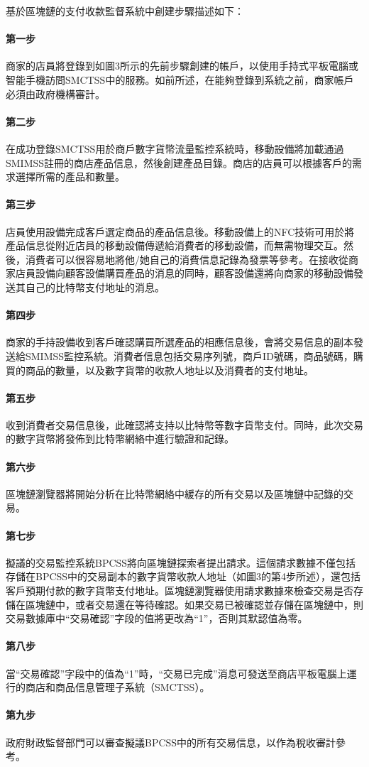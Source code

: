 	基於區塊鏈的支付收款監督系統中創建步驟描述如下：
		\paragraph{第一步}商家的店員將登錄到如圖3所示的先前步驟創建的帳戶，以使用手持式平板電腦或智能手機訪問SMCTSS中的服務。如前所述，在能夠登錄到系統之前，商家帳戶必須由政府機構審計。
		\paragraph{第二步}在成功登錄SMCTSS用於商戶數字貨幣流量監控系統時，移動設備將加載通過SMIMSS註冊的商店產品信息，然後創建產品目錄。商店的店員可以根據客戶的需求選擇所需的產品和數量。
		\paragraph{第三步}店員使用設備完成客戶選定商品的產品信息後。移動設備上的NFC技術可用於將產品信息從附近店員的移動設備傳遞給消費者的移動設備，而無需物理交互。然後，消費者可以很容易地將他/她自己的消費信息記錄為發票等參考。在接收從商家店員設備向顧客設備購買產品的消息的同時，顧客設備還將向商家的移動設備發送其自己的比特幣支付地址的消息。
		\paragraph{第四步}商家的手持設備收到客戶確認購買所選產品的相應信息後，會將交易信息的副本發送給SMIMSS監控系統。消費者信息包括交易序列號，商戶ID號碼，商品號碼，購買的商品的數量，以及數字貨幣的收款人地址以及消費者的支付地址。
		\paragraph{第五步}收到消費者交易信息後，此確認將支持以比特幣等數字貨幣支付。同時，此次交易的數字貨幣將發佈到比特幣網絡中進行驗證和記錄。
		\paragraph{第六步}區塊鏈瀏覽器將開始分析在比特幣網絡中緩存的所有交易以及區塊鏈中記錄的交易。
		\paragraph{第七步}擬議的交易監控系統BPCSS將向區塊鏈探索者提出請求。這個請求數據不僅包括存儲在BPCSS中的交易副本的數字貨幣收款人地址（如圖3的第4步所述），還包括客戶預期付款的數字貨幣支付地址。區塊鏈瀏覽器使用請求數據來檢查交易是否存儲在區塊鏈中，或者交易還在等待確認。如果交易已被確認並存儲在區塊鏈中，則交易數據庫中“交易確認”字段的值將更改為“1”，否則其默認值為零。
		\paragraph{第八步}當“交易確認”字段中的值為“1”時，“交易已完成”消息可發送至商店平板電腦上運行的商店和商品信息管理子系統（SMCTSS）。
		\paragraph{第九步}政府財政監督部門可以審查擬議BPCSS中的所有交易信息，以作為稅收審計參考。

	
